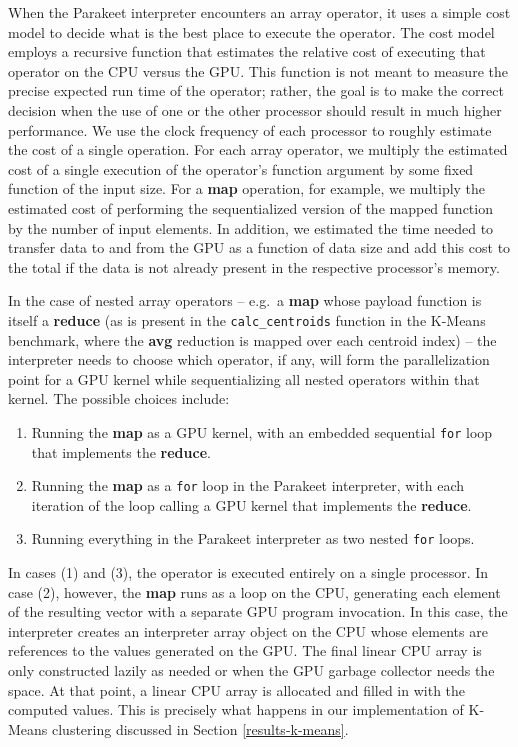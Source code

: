 \documentclass[preprint]{sigplanconf}
\begin{document}
When the Parakeet interpreter encounters an array operator, it uses a simple cost model to decide what is the best place to execute the operator.  The cost model employs a recursive function that estimates the relative cost of executing that operator on the CPU versus the GPU.  This function is not meant to measure the precise expected run time of the operator; rather, the goal is to make the correct decision when the use of one or the other processor should result in much higher performance.  We use the clock frequency of each processor to roughly estimate the cost of a single operation.  For each array operator, we multiply the estimated cost of a single execution of the operator's function argument by some fixed function of the input size.  For a \textbf{map} operation, for example, we multiply the estimated cost of performing the sequentialized version of the mapped function by the number of input elements. In addition, we estimated the time needed to transfer data to and from the GPU as a function of data size and add this cost to the total if the data is not already present in the respective processor's memory.

In the case of nested array operators -- e.g.~a \textbf{map} whose payload function is itself a \textbf{reduce} (as is present in the \texttt{calc\_centroids} function in the K-Means benchmark, where the \textbf{avg} reduction is mapped over each centroid index) -- the interpreter needs to choose which operator, if any, will form the parallelization point for a GPU kernel while sequentializing all nested operators within that kernel.  The possible choices include:

\begin{enumerate}
\item Running the \textbf{map} as a GPU kernel, with an embedded sequential \texttt{for} loop that implements the \textbf{reduce}.
\item Running the \textbf{map} as a \texttt{for} loop in the Parakeet interpreter, with each iteration of the loop calling a GPU kernel that implements the \textbf{reduce}.
\item Running everything in the Parakeet interpreter as two nested \texttt{for} loops.
\end{enumerate}

In cases (1) and (3), the operator is executed entirely on a single processor.  In case (2), however, the \textbf{map} runs as a loop on the CPU, generating each element of the resulting vector with a separate GPU program invocation.  In this case, the interpreter creates an interpreter array object on the CPU whose elements are references to the values generated on the GPU.  The final linear CPU array is only constructed lazily as needed or when the GPU garbage collector needs the space.  At that point, a linear CPU array is allocated and filled in with the computed values.  This is precisely what happens in our implementation of K-Means clustering discussed in Section \ref{results-k-means}.
\end{document}
